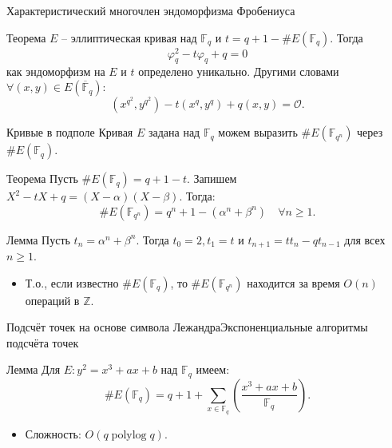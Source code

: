 \documentclass{beamer}
\begin{document}
\begin{frame}{Характеристический многочлен эндоморфизма Фробениуса}
\begin{block}{Теорема}
$E$ -- эллиптическая кривая над $\mathbb{F}_q$ и $t = q + 1 - \# E(\mathbb{F}_q)$. Тогда 
\[
\varphi _q^2 - t \varphi _q + q = 0
\]
как эндоморфизм на $E$ и $t$ определено уникально. Другими словами $\forall ( {x,y} ) \in E( \overline{\mathbb{F}}_q ):$
\begin{equation*}
(x^{q^2}, y^{q^2}) - t (x^q, y^q) + q(x,y) = \mathcal{O}.
\end{equation*}
\end{block}
\end{frame}

\begin{frame}{Кривые в подполе}
Кривая $E$ задана над $\mathbb{F}_q$ \structure{$\implies$} можем выразить $\# E(\mathbb{F}_{q^n})$ через $\# E( \mathbb{F}_q )$.

\begin{block}{Теорема}
Пусть $\# E( {{\mathbb{F}_q}} ) = q + 1 - t$. Запишем {\footnotesize $X^2 - t X + q = (X - \alpha)(X - \beta)$}. Тогда: 
$$
\# E(\mathbb{F}_{q^n}) = {q^n} + 1 - ( \alpha^n+ \beta ^n )\quad \forall n \geqslant 1.
$$
\end{block}

\begin{block}{Лемма}
Пусть $t_n = \alpha^n + \beta^n$. Тогда $t_0 = 2, t_1 = t$ и $t_{n+1} = t t_n - q t_{n-1}$ для всех $n \geq 1$.
\end{block}

\begin{itemize}
    \item Т.о., если известно $\#E(\mathbb{F}_q)$, то $\#E(\mathbb{F}_{q^n})$ находится за время $O(n)$ операций в $\mathbb{Z}$.
\end{itemize}
\end{frame}

\begin{frame}{Подсчёт точек на основе символа Лежандра}{Экспоненциальные алгоритмы подсчёта точек}
\begin{block}{Лемма}
Для $E: y^2 = x^3 + ax + b$ над $\mathbb{F}_q$ имеем:
\[
\# E(\mathbb{F}_q) = q + 1 + \sum\limits_{x \in \mathbb{F}_q} {\left(\frac{x^3 + ax + b}{\mathbb{F}_q} \right)}.
\]
\end{block}

\begin{itemize}
    \item Сложность: $O(q \operatorname{polylog}{q})$.
\end{itemize}
\end{frame}
\end{document}
